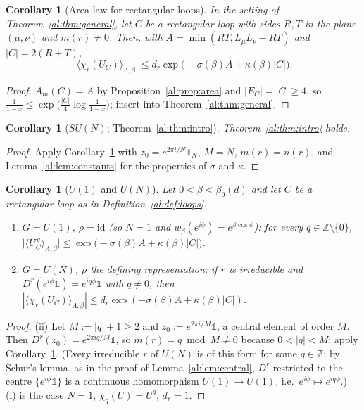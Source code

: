 \documentclass[11pt,a4paper]{article}
\newtheorem{corollary}[theorem]{Corollary}
\theoremstyle{definition}
\theoremstyle{remark}
\newcommand{\Z}{\mathbb{Z}}
\begin{document}
\begin{corollary}[Area law for rectangular loops]\label{al:cor:rect}
In the setting of Theorem~\ref{al:thm:general}, let $C$ be a rectangular loop with sides $R,T$ in the plane $(\mu,\nu)$ and
$m(r)\neq0$. Then, with $A=\min(RT,L_\mu L_\nu-RT)$ and $|C|=2(R+T)$,
\[
\bigl|\langle\chi_r(U_C)\rangle_{\Lambda,\beta}\bigr|\le d_r\exp\bigl(-\sigma(\beta)A+\kappa(\beta)|C|\bigr).
\]
\end{corollary}

\begin{proof}
$A_m(C)=A$ by Proposition~\ref{al:prop:area} and $|E_C|=|C|\ge4$, so
$\frac1{1-x}\le\exp\bigl(\frac{|C|}4\log\frac1{1-x}\bigr)$; insert into Theorem~\ref{al:thm:general}.
\end{proof}

\begin{corollary}[$SU(N)$; Theorem~\ref{al:thm:intro}]\label{al:cor:sun}
Theorem~\ref{al:thm:intro} holds.
\end{corollary}

\begin{proof}
Apply Corollary~\ref{al:cor:rect} with $z_0=e^{2\pi i/N}\mathbb 1_N$, $M=N$, $m(r)=n(r)$, and Lemma~\ref{al:lem:constants}
for the properties of $\sigma$ and $\kappa$.
\end{proof}

\begin{corollary}[$U(1)$ and $U(N)$]\label{al:cor:u1}
Let $0<\beta<\beta_0(d)$ and let $C$ be a rectangular loop as in Definition~\ref{al:def:loops}.
\begin{enumerate}[label=(\roman*)]
\item $G=U(1)$, $\rho=\mathrm{id}$ (so $N=1$ and $w_\beta(e^{i\phi})=e^{\beta\cos\phi}$): for every $q\in\Z\setminus\{0\}$,
$\bigl|\langle U_C^{\,q}\rangle_{\Lambda,\beta}\bigr|\le\exp\bigl(-\sigma(\beta)A+\kappa(\beta)|C|\bigr)$.
\item $G=U(N)$, $\rho$ the defining representation: if $r$ is irreducible and $D^r(e^{i\phi}\mathbb 1)=e^{iq\phi}\mathbb 1$ with
$q\neq0$, then $|\langle\chi_r(U_C)\rangle_{\Lambda,\beta}|\le d_r\exp(-\sigma(\beta)A+\kappa(\beta)|C|)$.
\end{enumerate}
\end{corollary}

\begin{proof}
(ii) Let $M:=|q|+1\ge2$ and $z_0:=e^{2\pi i/M}\mathbb 1$, a central element of order $M$. Then
$D^r(z_0)=e^{2\pi iq/M}\mathbb 1$, so $m(r)=q\bmod M\neq0$ because $0<|q|<M$; apply Corollary~\ref{al:cor:rect}.
(Every irreducible $r$ of $U(N)$ is of this form for some $q\in\Z$: by Schur's lemma, as in the proof of
Lemma~\ref{al:lem:central}, $D^r$ restricted to the centre $\{e^{i\phi}\mathbb 1\}$ is a continuous homomorphism
$U(1)\to U(1)$, i.e.\ $e^{i\phi}\mapsto e^{iq\phi}$.) (i) is the case $N=1$, $\chi_q(U)=U^q$, $d_r=1$.
\end{proof}
\end{document}
